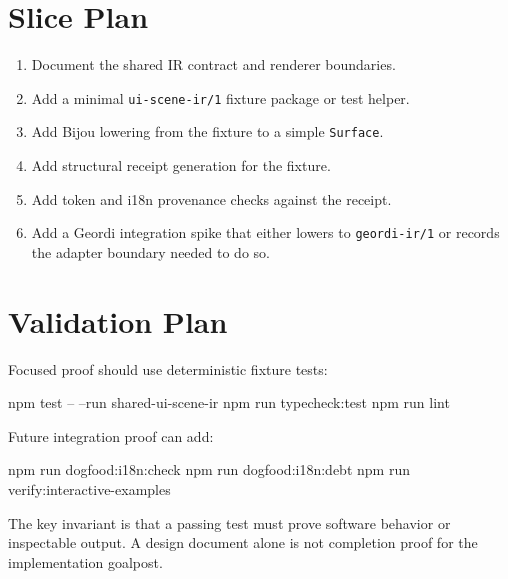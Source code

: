 \section{Slice Plan}\label{record-138-slice-plan}

\begin{enumerate}
\def\labelenumi{\arabic{enumi}.}
\tightlist
\item
  Document the shared IR contract and renderer boundaries.
\item
  Add a minimal \texttt{u\allowbreak{}i\allowbreak{}-\allowbreak{}s\allowbreak{}c\allowbreak{}e\allowbreak{}n\allowbreak{}e\allowbreak{}-\allowbreak{}i\allowbreak{}r\allowbreak{}/\allowbreak{}1} fixture package or test helper.
\item
  Add Bijou lowering from the fixture to a simple \texttt{S\allowbreak{}u\allowbreak{}r\allowbreak{}f\allowbreak{}a\allowbreak{}c\allowbreak{}e}.
\item
  Add structural receipt generation for the fixture.
\item
  Add token and i18n provenance checks against the receipt.
\item
  Add a Geordi integration spike that either lowers to \texttt{g\allowbreak{}e\allowbreak{}o\allowbreak{}r\allowbreak{}d\allowbreak{}i\allowbreak{}-\allowbreak{}i\allowbreak{}r\allowbreak{}/\allowbreak{}1} or records the adapter boundary needed to do so.
\end{enumerate}

\section{Validation Plan}\label{record-138-validation-plan}

Focused proof should use deterministic fixture tests:

\begin{CodeBlock}
npm test -- --run shared-ui-scene-ir
npm run typecheck:test
npm run lint
\end{CodeBlock}

Future integration proof can add:

\begin{CodeBlock}
npm run dogfood:i18n:check
npm run dogfood:i18n:debt
npm run verify:interactive-examples
\end{CodeBlock}

The key invariant is that a passing test must prove software behavior or inspectable output. A design document alone is not completion proof for the implementation goalpost.

